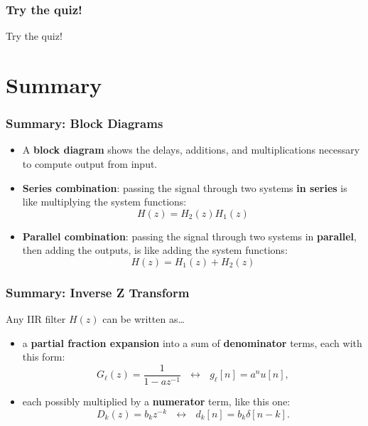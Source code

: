\documentclass{beamer}
\begin{document}
\begin{frame}
  \frametitle{Try the quiz!}

  Try the quiz!

\end{frame}

\section[Summary]{Summary}
\setcounter{subsection}{1}

\begin{frame}
  \frametitle{Summary: Block Diagrams}
  \begin{itemize}
  \item A {\bf block diagram} shows the delays, additions, and
    multiplications necessary to compute output from input.
  \item {\bf Series combination}: passing the signal through two
    systems {\bf in series} is like multiplying the system functions:
    \[
    H(z)=H_2(z)H_1(z)
    \]
  \item {\bf Parallel combination}: passing the signal through two
    systems in {\bf parallel}, then adding the outputs, is like adding
    the system functions:
    \[
    H(z) = H_1(z)+H_2(z)
    \]
  \end{itemize}
\end{frame}
  
\begin{frame}
  \frametitle{Summary: Inverse Z Transform}

  Any IIR filter $H(z)$ can be written as\ldots
  \begin{itemize}
  \item a {\bf partial fraction expansion} into a sum of {\bf
    denominator} terms, each with this form:
    \begin{displaymath}
      G_\ell(z)=\frac{1}{1-az^{-1}}~~~\leftrightarrow~~~g_\ell[n]= a^nu[n],
    \end{displaymath}
  \item each possibly multiplied by a {\bf numerator} term, like this one:
    \begin{displaymath}
      D_k(z)=b_kz^{-k}~~~\leftrightarrow~~~d_k[n]=b_k\delta[n-k].
    \end{displaymath}
  \end{itemize}
\end{frame}
\end{document}
